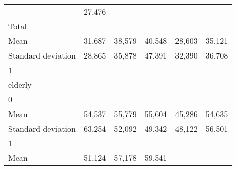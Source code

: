 \begin{tabular}{llllll}
  \multicolumn{1}{r}{} &
  \multicolumn{1}{r}{27,476} \\
\multicolumn{1}{l}{\hspace{3em}Total} &
  \multicolumn{1}{|r}{} &
  \multicolumn{1}{r}{} &
  \multicolumn{1}{r}{} &
  \multicolumn{1}{r}{} &
  \multicolumn{1}{r}{} \\
\multicolumn{1}{l}{\hspace{4em}Mean} &
  \multicolumn{1}{|r}{31,687} &
  \multicolumn{1}{r}{38,579} &
  \multicolumn{1}{r}{40,548} &
  \multicolumn{1}{r}{28,603} &
  \multicolumn{1}{r}{35,121} \\
\multicolumn{1}{l}{\hspace{4em}Standard deviation} &
  \multicolumn{1}{|r}{28,865} &
  \multicolumn{1}{r}{35,878} &
  \multicolumn{1}{r}{47,391} &
  \multicolumn{1}{r}{32,390} &
  \multicolumn{1}{r}{36,708} \\
\multicolumn{1}{l}{\hspace{1em}1} &
  \multicolumn{1}{|r}{} &
  \multicolumn{1}{r}{} &
  \multicolumn{1}{r}{} &
  \multicolumn{1}{r}{} &
  \multicolumn{1}{r}{} \\
\multicolumn{1}{l}{\hspace{2em}elderly} &
  \multicolumn{1}{|r}{} &
  \multicolumn{1}{r}{} &
  \multicolumn{1}{r}{} &
  \multicolumn{1}{r}{} &
  \multicolumn{1}{r}{} \\
\multicolumn{1}{l}{\hspace{3em}0} &
  \multicolumn{1}{|r}{} &
  \multicolumn{1}{r}{} &
  \multicolumn{1}{r}{} &
  \multicolumn{1}{r}{} &
  \multicolumn{1}{r}{} \\
\multicolumn{1}{l}{\hspace{4em}Mean} &
  \multicolumn{1}{|r}{54,537} &
  \multicolumn{1}{r}{55,779} &
  \multicolumn{1}{r}{55,604} &
  \multicolumn{1}{r}{45,286} &
  \multicolumn{1}{r}{54,635} \\
\multicolumn{1}{l}{\hspace{4em}Standard deviation} &
  \multicolumn{1}{|r}{63,254} &
  \multicolumn{1}{r}{52,092} &
  \multicolumn{1}{r}{49,342} &
  \multicolumn{1}{r}{48,122} &
  \multicolumn{1}{r}{56,501} \\
\multicolumn{1}{l}{\hspace{3em}1} &
  \multicolumn{1}{|r}{} &
  \multicolumn{1}{r}{} &
  \multicolumn{1}{r}{} &
  \multicolumn{1}{r}{} &
  \multicolumn{1}{r}{} \\
\multicolumn{1}{l}{\hspace{4em}Mean} &
  \multicolumn{1}{|r}{51,124} &
  \multicolumn{1}{r}{57,178} &
  \multicolumn{1}{r}{59,541} &

\end{tabular}
